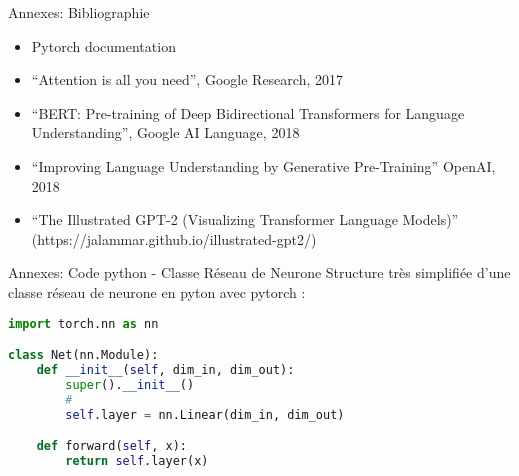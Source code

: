 \documentclass[12pt]{beamer}
\begin{document}

\begin{frame}{Annexes: Bibliographie}
\footnotesize
\begin{itemize}
	\item Pytorch documentation
	\item ``Attention is all you need'', Google Research, 2017
	\item ``BERT: Pre-training of Deep Bidirectional Transformers for Language Understanding'', Google AI Language, 2018
	\item ``Improving Language Understanding by Generative Pre-Training'' OpenAI, 2018
	\item ``The Illustrated GPT-2 (Visualizing Transformer Language Models)'' (https://jalammar.github.io/illustrated-gpt2/)
\end{itemize}

\end{frame}



\begin{frame}[fragile]{Annexes: Code python - Classe Réseau de Neurone}
\footnotesize
Structure très simplifiée d'une classe réseau de neurone en pyton avec pytorch : 
\begin{tcolorbox}[colback=white,boxsep=2mm,arc=1pt,
    auto outer arc,left=1mm,right=1mm,top=1mm,bottom=1mm,boxrule=0.5pt,width=\textwidth]
\begin{lstlisting}[language=python]
import torch.nn as nn

class Net(nn.Module):  
    def __init__(self, dim_in, dim_out):
        super().__init__()
        #
        self.layer = nn.Linear(dim_in, dim_out)

    def forward(self, x):
        return self.layer(x)
\end{lstlisting}
\end{tcolorbox}
\normalsize
\end{frame}
\end{document}
